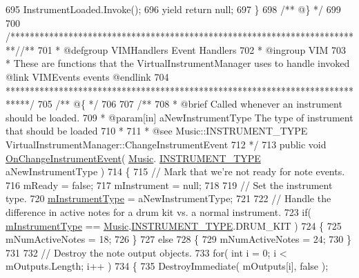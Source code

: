 \begin{DoxyCodeInclude}
695         InstrumentLoaded.Invoke();
696         yield \textcolor{keywordflow}{return} null;
697     \}\textcolor{comment}{}
698 \textcolor{comment}{    /** @\} */}
699 
700     \textcolor{comment}{/*************************************************************************/}\textcolor{comment}{/** }
701 \textcolor{comment}{    * @defgroup VIMHandlers Event Handlers}
702 \textcolor{comment}{    * @ingroup VIM}
703 \textcolor{comment}{    * These are functions that the VirtualInstrumentManager uses to handle invoked @link VIMEvents events
       @endlink}
704 \textcolor{comment}{    *****************************************************************************/}\textcolor{comment}{}
705 \textcolor{comment}{    /** @\{ */}
706 \textcolor{comment}{}
707 \textcolor{comment}{    /**}
708 \textcolor{comment}{     * @brief Called whenever an instrument should be loaded. }
709 \textcolor{comment}{     * @param[in] aNewInstrumentType The type of instrument that should be loaded}
710 \textcolor{comment}{     * }
711 \textcolor{comment}{     * @see Music::INSTRUMENT\_TYPE VirtualInstrumentManager::ChangeInstrumentEvent}
712 \textcolor{comment}{    */}
713     \textcolor{keyword}{public} \textcolor{keywordtype}{void} \hyperlink{group___v_i_m_handlers_ga8e79286073756c31e08fecd59ce04fa7}{OnChangeInstrumentEvent}( \hyperlink{class_music}{Music}.
      \hyperlink{group___music_enums_gabfce60192305965558a36e368ebd67c3}{INSTRUMENT\_TYPE} aNewInstrumentType )
714     \{
715         \textcolor{comment}{// Mark that we're not ready for note events.}
716         mReady = \textcolor{keyword}{false};
717         mInstrument = null;
718 
719         \textcolor{comment}{// Set the instrument type.}
720         \hyperlink{group___v_i_m_priv_ga108c350257b3a2080e06cd4a8251f6a4}{mInstrumentType} = aNewInstrumentType;
721 
722         \textcolor{comment}{// Handle the difference in active notes for a drum kit vs. a normal instrument.}
723         \textcolor{keywordflow}{if}( \hyperlink{group___v_i_m_priv_ga108c350257b3a2080e06cd4a8251f6a4}{mInstrumentType} == \hyperlink{class_music}{Music}.\hyperlink{group___music_enums_gabfce60192305965558a36e368ebd67c3}{INSTRUMENT\_TYPE}.DRUM\_KIT )
724         \{
725             mNumActiveNotes = 18;
726         \}
727         \textcolor{keywordflow}{else}
728         \{
729             mNumActiveNotes = 24;
730         \}
731 
732         \textcolor{comment}{// Destroy the note output objects.}
733         \textcolor{keywordflow}{for}( \textcolor{keywordtype}{int} i = 0; i < mOutputs.Length; i++ )
734         \{
735             DestroyImmediate( mOutputs[i], \textcolor{keyword}{false} );

\end{DoxyCodeInclude}
